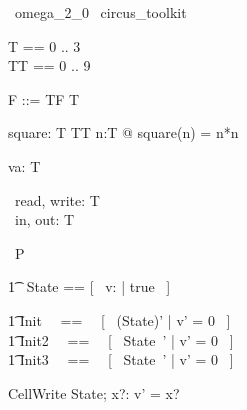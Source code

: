\begin{zsection}
  \SECTION\ omega\_2\_0 \parents\ circus\_toolkit
\end{zsection}

\begin{zed}
	T == 0 .. 3 \\
	TT == 0 .. 9 \\
\end{zed}

\begin{zed}
    F ::= TF \ldata T \rdata
\end{zed}

\begin{axdef}
    square: T \fun TT 
\where
    \forall n:T @ square(n) = n*n
\end{axdef}

\begin{axdef}
    va: T 
\end{axdef}

\begin{circus}
	\circchannel\ read, write: T \\
	\circchannel\ in, out: T \\
\end{circus}

\begin{circus}
    \circprocess\ P \circdef \circbegin \\
\end{circus}

\begin{circusaction}
        \t1 \circstate\ State == [~ v: \nat | true ~] \\
\end{circusaction}

\begin{circusaction}
        \t1 Init ~~==~~ [~ (State)' | v' = 0 ~] \\
        \t1 Init2 ~~==~~ [~ State~' | v' = 0 ~] \\
        \t1 Init3 ~~==~~ [~ State\ ' | v' = 0 ~] \\
\end{circusaction}

\begin{schema}{CellWrite}
    \Delta State; x?: \nat 
    \where
    v' = x? 
\end{schema}

